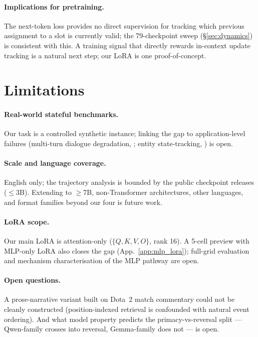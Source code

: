 \documentclass[11pt]{article}
\begin{document}
\paragraph{Implications for pretraining.}
The next-token loss provides no direct supervision for tracking
which previous assignment to a slot is currently valid; the
79-checkpoint sweep (\S\ref{sec:dynamics}) is consistent with this.
A training signal that directly rewards in-context update tracking
is a natural next step; our LoRA is one proof-of-concept.

\section*{Limitations}

\paragraph{Real-world stateful benchmarks.}
Our task is a controlled synthetic instance; linking the gap to
application-level failures (multi-turn dialogue degradation,
\citealp{laban2025multiturn}; entity state-tracking,
\citealp{rezaee2025state}) is open.

\paragraph{Scale and language coverage.}
English only; the trajectory analysis is bounded by the public
checkpoint releases ($\leq{}$3B). Extending to $\geq{}$7B,
non-Transformer architectures, other languages, and format families
beyond our four is future work.

\paragraph{LoRA scope.}
Our main LoRA is attention-only ($\{Q, K, V, O\}$, rank 16). A
5-cell preview with MLP-only LoRA also closes the gap
(App.~\ref{app:mlp_lora}); full-grid evaluation and mechanism
characterisation of the MLP pathway are open.

\paragraph{Open questions.}
A prose-narrative variant built on Dota~2 match commentary could
not be cleanly constructed (position-indexed retrieval is confounded
with natural event ordering). And what model property predicts the
primacy-vs-reversal split --- Qwen-family crosses into reversal,
Gemma-family does not --- is open.
\end{document}
